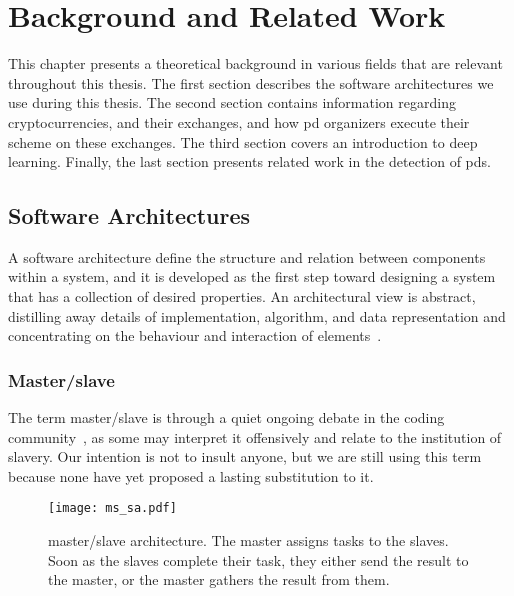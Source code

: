 
\chapter{Background and Related Work}\label{ch:background}\glsresetall
This chapter presents a theoretical background in various fields that are relevant throughout this thesis. The first section describes the software architectures we use during this thesis. The second section contains information regarding cryptocurrencies, and their exchanges, and how  \ac{pd} organizers execute their scheme on these exchanges. The third section covers an introduction to deep learning. Finally, the last section presents related work in the detection of \acp{pd}.

\section{Software Architectures}
A software architecture define the structure and relation between components within a system, and it is developed as the first step toward designing a system that has a collection of desired properties. An architectural view is abstract, distilling away details of implementation, algorithm, and data representation and concentrating on the behaviour and interaction of elements~\cite[p.~3]{bass2003software}.

\subsection{Master/slave}\label{sec:master_slave}
The term master/slave is through a quiet ongoing debate in the coding community~\cite{giz_master, reg_master, med_master}, as some may interpret it offensively and relate to the institution of slavery. Our intention is not to insult anyone, but we are still using this term because none have yet proposed a lasting substitution to it.

\begin{figure}[ht]
    \centering
    \texttt{[image: ms\_sa.pdf]}
    \caption[Architecture - master/slave]{master/slave architecture. The master assigns tasks to the slaves. Soon as the slaves complete their task, they either send the result to the master, or the master gathers the result from them.}
    \label{fig:msa}
\end{figure}

